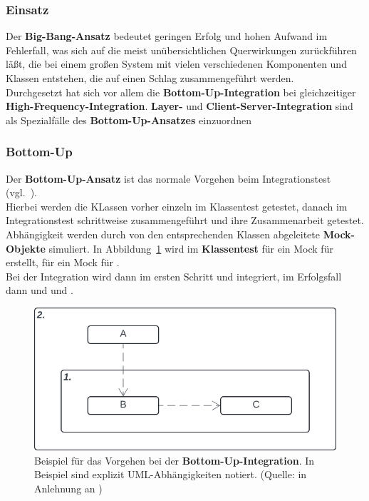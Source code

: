\subsubsection*{Einsatz}
Der \textbf{Big-Bang-Ansatz} bedeutet geringen Erfolg und hohen Aufwand im Fehlerfall, was sich auf die meist unübersichtlichen Querwirkungen zurückführen läßt, die bei einem großen System mit vielen verschiedenen Komponenten und Klassen entstehen, die auf einen Schlag zusammengeführt werden.\\
Durchgesetzt hat sich vor allem die \textbf{Bottom-Up-Integration} bei gleichzeitiger \textbf{High-Frequency-Integration}. \textbf{Layer-} und \textbf{Client-Server-Integration} sind als Spezialfälle des \textbf{Bottom-Up-Ansatzes} einzuordnen

\subsubsection*{Bottom-Up}
Der \textbf{Bottom-Up-Ansatz} ist das normale Vorgehen beim Integrationstest (vgl.~\cite[60]{Wed09c}).\\
Hierbei werden die KLassen vorher einzeln im Klassentest getestet, danach im Integrationstest schrittweise zusammengeführt und ihre Zusammenarbeit getestet.
Abhängigkeit werden durch von den entsprechenden Klassen abgeleitete \textbf{Mock-Objekte} simuliert.
In Abbildung~\ref{fig:bottomup} wird im \textbf{Klassentest} für  ein Mock für  erstellt, für  ein Mock für .\\
Bei der Integration wird dann im ersten Schritt  und  integriert, im Erfolgsfall dann  und  und .

\begin{figure}
    \centering
    \includegraphics[scale=0.4]{part four/Testende Verfahren/img/bottomup}
    \caption{Beispiel für das Vorgehen bei der \textbf{Bottom-Up-Integration}. In Beispiel sind explizit UML-Abhängigkeiten notiert. (Quelle: in Anlehnung an \cite[Abb. 5.5, 60]{Wed09c})}
    \label{fig:bottomup}
\end{figure}

